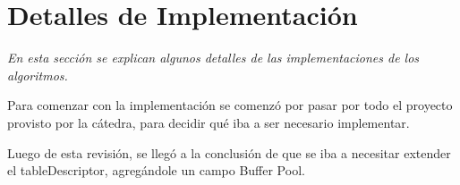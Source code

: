\section{Detalles de Implementaci\'on}

\textsl{En esta secci\'on se explican algunos detalles de las
implementaciones de los algoritmos.}

\vspace*{0.5cm}


Para comenzar con la implementación se comenzó por pasar por todo el proyecto 
provisto por la cátedra, para decidir qué iba a ser necesario implementar.

Luego de esta revisión, se llegó a la conclusión de que se iba a necesitar 
extender el tableDescriptor, agregándole un campo Buffer Pool.

